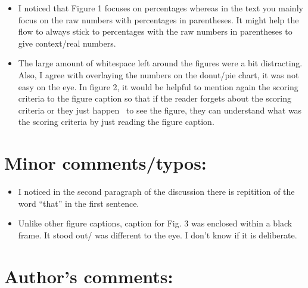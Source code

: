 \documentclass[10pt]{article}
\providecommand{\tightlist}{\setlength{\itemsep}{0pt}\setlength{\parskip}{0pt}}%
\begin{document}
\begin{itemize}
\tightlist
\item
  I noticed that Figure 1 focuses on percentages whereas in the text you
  mainly focus on the raw numbers with percentages in parentheses. It
  might help the flow to always stick to percentages with the raw
  numbers in parentheses to give context/real numbers.
\end{itemize}

\begin{itemize}
\tightlist
\item
  The large amount of whitespace left around the figures were a bit
  distracting. Also, I agree with overlaying the numbers on the
  donut/pie chart, it was not easy on the eye. In figure 2, it would be
  helpful to mention again the scoring criteria to the figure caption so
  that if the reader forgets about the scoring criteria or they just
  happen~ to see the figure, they can understand what was the scoring
  criteria by just reading the figure caption.
\end{itemize}

\par\null

\section*{Minor comments/typos:}

{\label{294569}}

\begin{itemize}
\tightlist
\item
  I noticed in the second paragraph of the discussion there is
  repitition of the word ``that'' in the first sentence.
\end{itemize}

\begin{itemize}
\tightlist
\item
  Unlike other figure captions, caption for Fig. 3 was enclosed within a
  black frame. It stood out/ was different to the eye. I don't know if
  it is deliberate.
\end{itemize}

\par\null

\section*{Author's comments:}

{\label{991538}}\par\null
\end{document}
